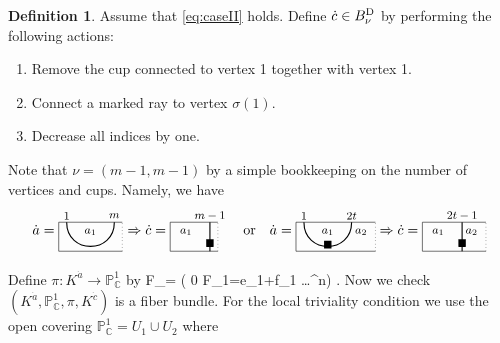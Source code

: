 \documentclass[11pt,reqno]{amsart}
\numberwithin{equation}{section}
\theoremstyle{definition}
\newtheorem{definition}[theorem]{Definition}
\def\<{\langle}
\def\>{\rangle}
\newcommand{\BD}{{B}^\textup{D}}
\newcommand{\CP}{\mathbb{P}_\mathbb{C}}
\newcommand{\da}{\dot{a}}
\newcommand{\dc}{\dot{c}}
\newcommand{\ld}{\lambda}
\newcommand{\icupc}{
\begin{tikzpicture}[baseline={(0,-.3)}, scale = 0.8]
\draw (3.25,0) -- (0.75,0) -- (0.75,-.9) -- (3.25,-.9);
\draw[dotted] (3.25,-.9) -- (3.25,0);\begin{footnotesize}
\node at (2.5,.2) {$2t$};
\node at (1,.2) {$1$};
\node at (1.75, -.7) {$\blacksquare$};
\node at (1.75, -.3) {$a_1$};
\node at (2.8, -.3) {$a_2$};
\end{footnotesize}
\draw[thick] (1,0) .. controls +(0,-1) and +(0,-1) .. +(1.5,0);
\end{tikzpicture}
}
\begin{document}
\begin{definition}\label{def:ac}
Assume that \eqref{eq:caseII} holds. Define $\dc \in \BD_\nu$ by performing the following actions:
\begin{enumerate} 
\item Remove the cup connected to vertex 1 together with vertex 1. 
\item Connect a marked ray to vertex $\sigma(1)$.
\item Decrease all indices by one.
\end{enumerate}
Note that $\nu =(m-1,m-1)$ by a simple bookkeeping on the number of vertices and cups.
Namely, we have
\[
\da=
\begin{tikzpicture}[baseline={(0,-.3)}, scale = 0.8]
\draw (2.75,0) -- (0.75,0) -- (0.75,-.9) -- (2.75,-.9);
\draw[dotted] (2.75,-.9) -- (2.75,0);\begin{footnotesize}
\node at (2.5,.2) {$m$};
\node at (1,.2) {$1$};
\node at (1.75, -.3) {$a_1$};
\end{footnotesize}
\draw[thick] (1,0) .. controls +(0,-1) and +(0,-1) .. +(1.5,0);
\end{tikzpicture}
\Rightarrow
\dc=
\begin{tikzpicture}[baseline={(0,-.3)}, scale = 0.8]
\draw (2.75,0) -- (1.25,0) -- (1.25,-.9) -- (2.75,-.9);
\draw[dotted] (2.75,-.9) -- (2.75,0);\begin{footnotesize}
\node at (2.5,.2) {$m-1$};
\node at (2.5, -.65) {$\blacksquare$};
\node at (1.75, -.3) {$a_1$};
\end{footnotesize}
\draw[thick] (2.5,0) -- (2.5,-.9); 
\end{tikzpicture}
\quad
\textup{or}
\quad
\da=
\icupc 
\Rightarrow
\dc=
\begin{tikzpicture}[baseline={(0,-.3)}, scale = 0.8]
\draw (3.25,0) -- (1.25,0) -- (1.25,-.9) -- (3.25,-.9);
\draw[dotted] (3.25,-.9) -- (3.25,0);\begin{footnotesize}
\node at (2.5,.2) {$2t-1$};
\node at (2.5, -.65) {$\blacksquare$};
\node at (1.75, -.3) {$a_1$};
\node at (2.8, -.3) {$a_2$};
\end{footnotesize}
\draw[thick] (2.5,0) -- (2.5,-.9); 
\end{tikzpicture}
\]
\end{definition}
Define  $\pi:K^{\da}\to \CP^1$ by
\eq
F_\bullet = ( 0 \subset F_1=\<\ld e_1+\mu f_1\> \subset \ldots \subset\CC^n) \mapsto [\ld:\mu].
\endeq
Now we check $(K^{\da}, \CP^1, \pi, K^{\dc})$ is a fiber bundle. For the local triviality condition we use the open covering $\CP^1 = U_1 \cup U_2$ where
\end{document}

